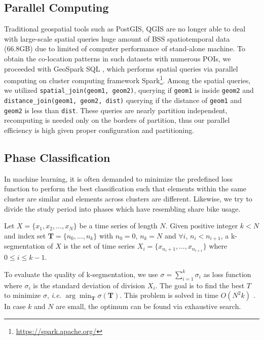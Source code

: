 \documentclass[preprints,article,accept,moreauthors,pdftex]{Definitions/mdpi}
\begin{document}
\subsection{Parallel Computing}
Traditional geospatial tools such as PostGIS, QGIS are no longer able to deal with large-scale spatial queries huge amount of BSS spatiotemporal data (66.8GB) due to limited of computer performance of stand-alone machine.
To obtain the co-location patterns in such datasets with numerous POIs, we proceeded with GeoSpark SQL \cite{huang2017geospark}, which performs spatial queries via parallel computing on cluster computing framework Spark\footnote{\url{https://spark.apache.org/}}.
Among the spatial queries, we utilized \texttt{spatial\_join(geom1, geom2)}, querying if \texttt{geom1} is inside \texttt{geom2} and \texttt{distance\_join(geom1, geom2, dist)} querying if the distance of \texttt{geom1} and \texttt{geom2} is less than \texttt{dist}.
These queries are nearly partition independent, recomputing is needed only on the borders of partition, thus our parallel efficiency is high given proper configuration and partitioning.

\subsection{Phase Classification}\label{sec:phase_classification}
In machine learning, it is often demanded to minimize the predefined loss function to perform the best classification such that elements within the same cluster are similar and elements across clusters are different.
Likewise, we try to divide the study period into phases which have resembling share bike usage.

\begin{Definition}[k-segmentation]\label{def:k-seg}
Let $X=\{x_1,x_2,\ldots,x_N\}$ be a time series of length $N$.
Given positive integer $k<N$ and index set $\mathbf{T}=\{n_0,\ldots,n_k\}$ with $n_0=0$, $n_k=N$ and $\forall i$, $n_i<n_{i+1}$, a k-segmentation of $X$ is the set of time series $X_i=\{x_{n_i+1},\ldots,x_{n_{i+1}}\}$ where $0\leq i\leq k-1$.
\end{Definition}

To evaluate the quality of k-segmentation, we use $\sigma=\sum_{i=1}^{k}{\sigma_i}$ as loss function where $\sigma_i$ is the standard deviation of division $X_i$. 
The goal is to find the best $T$ to minimize $\sigma$, \textit{i.e.} $\arg\min_{\mathbf{T}}\sigma(\mathbf{T})$.
This problem is solved in time $O(N^2k)$ \cite{terzi2006efficient}.
In case $k$ and $N$ are small, the optimum can be found via exhaustive search.
\end{document}
